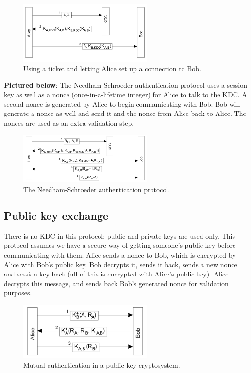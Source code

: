 \documentclass[twoside]{article}
\begin{document}
\begin{figure}[H]
\centering
\includegraphics[width=0.6\textwidth]{kdc2.png}
\caption{Using a ticket and letting Alice set up a connection to Bob.}
\end{figure}

\textbf{Pictured below}: The Needham-Schroeder authentication protocol uses a session key as well as a nonce (once-in-a-lifetime integer) for Alice to talk to the KDC. A second nonce is generated by Alice to begin communicating with Bob. Bob will generate a nonce as well and send it and the nonce from Alice back to Alice. The nonces are used as an extra validation step.

\begin{figure}[H]
\centering
\includegraphics[width=0.6\textwidth]{kdc3.png}
\caption{The Needham-Schroeder authentication protocol.}
\end{figure}

\subsection{Public key exchange}

There is no KDC in this protocol; public and private keys are used only. This protocol assumes we have a secure way of getting someone's public key before communicating with them. Alice sends a nonce to Bob, which is encrypted by Alice with Bob's public key. Bob decrypts it, sends it back, sends a new nonce and session key back (all of this is encrypted with Alice's public key). Alice decrypts this message, and sends back Bob's generated nonce for validation purposes.

\begin{figure}[H]
\centering
\includegraphics[width=0.6\textwidth]{public_key_exchange.png}
\caption{Mutual authentication in a public-key cryptosystem.}
\end{figure}
\end{document}
